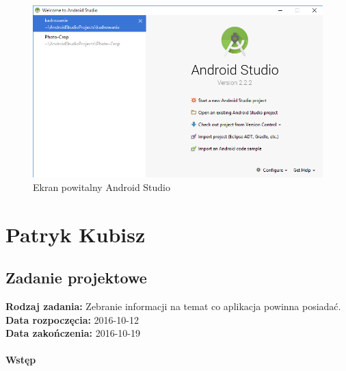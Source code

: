 \begin{figure}[h!]
\centering
\includegraphics[width=0.7\linewidth]{fig/i6}
\caption{Ekran powitalny Android Studio}
\label{fig:16}
\end{figure}

\chapter {Patryk Kubisz}
\section{Zadanie projektowe}

\noindent\textbf{Rodzaj zadania:} Zebranie informacji na temat co aplikacja powinna posiadać.\\

\noindent\textbf{Data rozpoczęcia:} 2016-10-12\\

\noindent\textbf{Data zakończenia:} 2016-10-19\\\\

\noindent\textbf{Wstęp}\\

